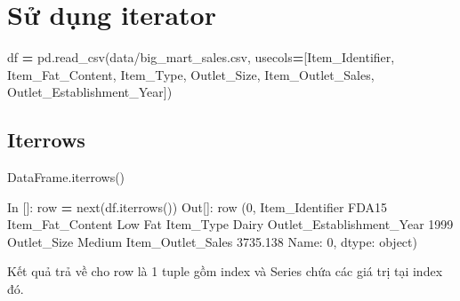 \documentclass[
]{book}
\newenvironment{Shaded}{\begin{snugshade}}{\end{snugshade}}
\newcommand{\BuiltInTok}[1]{#1}
\newcommand{\DecValTok}[1]{\textcolor[rgb]{0.00,0.00,0.81}{#1}}
\newcommand{\FloatTok}[1]{\textcolor[rgb]{0.00,0.00,0.81}{#1}}
\newcommand{\NormalTok}[1]{#1}
\newcommand{\OperatorTok}[1]{\textcolor[rgb]{0.81,0.36,0.00}{\textbf{#1}}}
\newcommand{\StringTok}[1]{\textcolor[rgb]{0.31,0.60,0.02}{#1}}
\begin{document}
\section{Sử dụng iterator}\label{sux1eed-dux1ee5ng-iterator}

\begin{Shaded}
\begin{Highlighting}[]
\NormalTok{df }\OperatorTok{=}\NormalTok{ pd.read\_csv(}\StringTok{\textquotesingle{}data/big\_mart\_sales.csv\textquotesingle{}}\NormalTok{, usecols}\OperatorTok{=}\NormalTok{[}\StringTok{\textquotesingle{}Item\_Identifier\textquotesingle{}}\NormalTok{, }\StringTok{\textquotesingle{}Item\_Fat\_Content\textquotesingle{}}\NormalTok{, }\StringTok{\textquotesingle{}Item\_Type\textquotesingle{}}\NormalTok{, }\StringTok{\textquotesingle{}Outlet\_Size\textquotesingle{}}\NormalTok{, }\StringTok{\textquotesingle{}Item\_Outlet\_Sales\textquotesingle{}}\NormalTok{, }\StringTok{\textquotesingle{}Outlet\_Establishment\_Year\textquotesingle{}}\NormalTok{])}
\end{Highlighting}
\end{Shaded}

\subsection{Iterrows}\label{iterrows}

\begin{Shaded}
\begin{Highlighting}[]
\NormalTok{DataFrame.iterrows()}
\end{Highlighting}
\end{Shaded}

\begin{Shaded}
\begin{Highlighting}[]
\NormalTok{In []: row }\OperatorTok{=} \BuiltInTok{next}\NormalTok{(df.iterrows())}
\NormalTok{Out[]: row}
\NormalTok{(}\DecValTok{0}\NormalTok{,}
\NormalTok{ Item\_Identifier                 FDA15}
\NormalTok{ Item\_Fat\_Content              Low Fat}
\NormalTok{ Item\_Type                       Dairy}
\NormalTok{ Outlet\_Establishment\_Year        }\DecValTok{1999}
\NormalTok{ Outlet\_Size                    Medium}
\NormalTok{ Item\_Outlet\_Sales            }\FloatTok{3735.138}
\NormalTok{ Name: }\DecValTok{0}\NormalTok{, dtype: }\BuiltInTok{object}\NormalTok{)}
\end{Highlighting}
\end{Shaded}

Kết quả trả về cho row là 1 tuple gồm index và Series chứa các giá trị tại index đó.
\end{document}
